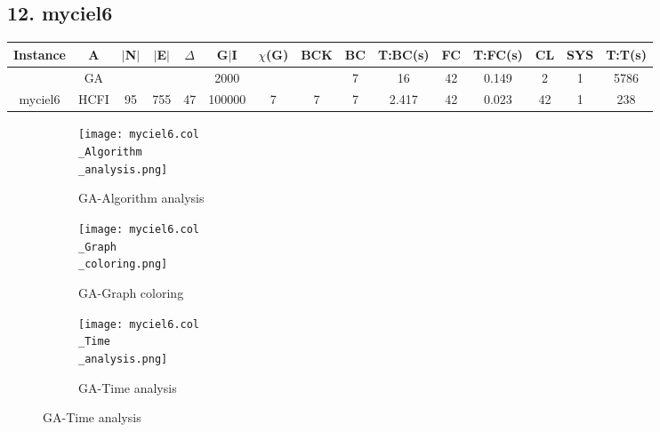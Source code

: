 \documentclass[10pt]{article}
\begin{document}
\subsection*{\hspace{0,9073976cm} 12. myciel6}
\begin{table}[H]
\centering
\begin{tabular}{|c|c|c|c|c|c|c|c|c|c|c|c|c|c|c|}
\hline
Instance& A &$|$N$|$ & $|$E$|$ & $\Delta$ & G$|$I & $\chi$(G) &BCK&BC & T:BC(s) & FC & T:FC(s) & CL & SYS & T:T(s) \\ \hline \hline
&GA&       &                   &                     &2000         &     \cellcolor{yellow} & {\cellcolor{yellow}}& {{\cellcolor{green}7}}
&16   & 42       & 0.149                 &2                   &1          & 5786       \\ \cline{2-2} \cline{6-6} \cline{9-15}
 \multirow{-2}{*}{myciel6} &HCFI   &\multirow{-2}{*}{95}   &\multirow{-2}{*}{755}     &\multirow{-2}{*}{47}     &100000     &\multirow{-2}{*}{\cellcolor{yellow}7}      & \multirow{-2}{*}{\cellcolor{yellow}7}    &{\cellcolor{green}7}     & 2.417         &42    &0.023         &42    &1     &238        \\ \hline 
\end{tabular}
\end{table}

\graphicspath{{./Core1/Solutions/GA/myciel6.col}}
\begin{figure}[H]
\begin{subfigure}{.33\textwidth}
  \centering
  \texttt{[image: myciel6.col\\\_Algorithm\\\_analysis.png]}
  \caption{GA-Algorithm analysis}
   \label{fig:subfig1}
\end{subfigure}%
\begin{subfigure}{.33\textwidth}
  \centering
  \texttt{[image: myciel6.col\\\_Graph\\\_coloring.png]}
  \caption{GA-Graph coloring}
  \label{fig:subfig2}
\end{subfigure}
\begin{subfigure}{.33\textwidth}
  \centering
  \texttt{[image: myciel6.col\\\_Time\\\_analysis.png]}
  \caption{GA-Time analysis}
  \end{subfigure}
\end{figure}
\end{document}
